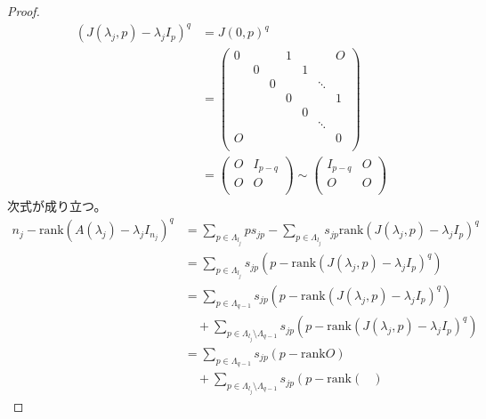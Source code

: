 \documentclass[dvipdfmx]{jsarticle}
\begin{document}
\begin{proof}
\begin{align*}
\left( J\left( \lambda_{j},p \right) - \lambda_{j}I_{p} \right)^{q} &= {J(0,p)}^{q}\\
&= \begin{pmatrix}
0 & \  & \  & 1 & \  & \  & O \\
\  & 0 & \  & \  & 1 & \  & \  \\
\  & \  & 0 & \  & \  & \ddots & \  \\
\  & \  & \  & 0 & \  & \  & 1 \\
\  & \  & \  & \  & 0 & \  & \  \\
\  & \  & \  & \  & \  & \ddots & \  \\
O & \  & \  & \  & \  & \  & 0 \\
\end{pmatrix}\\
&= \begin{pmatrix}
O & I_{p - q} \\
O & O \\
\end{pmatrix} \sim \begin{pmatrix}
I_{p - q} & O \\
O & O \\
\end{pmatrix}
\end{align*}
次式が成り立つ。
\begin{align*}
n_{j} - {\mathrm{rank}}\left( A\left( \lambda_{j} \right) - \lambda_{j}I_{n_{j}} \right)^{q} &= \sum_{p \in \varLambda_{l_{j}}} {ps_{jp}} - \sum_{p \in \varLambda_{l_{j}}} {s_{jp}{\mathrm{rank}}\left( J\left( \lambda_{j},p \right) - \lambda_{j}I_{p} \right)^{q}}\\
&= \sum_{p \in \varLambda_{l_{j}}} {s_{jp}\left( p - {\mathrm{rank}}\left( J\left( \lambda_{j},p \right) - \lambda_{j}I_{p} \right)^{q} \right)}\\
&= \sum_{p \in \varLambda_{q - 1}} {s_{jp}\left( p - {\mathrm{rank}}\left( J\left( \lambda_{j},p \right) - \lambda_{j}I_{p} \right)^{q} \right)} \\
&\quad + \sum_{p \in \varLambda_{l_{j}} \setminus \varLambda_{q - 1}} {s_{jp}\left( p - {\mathrm{rank}}\left( J\left( \lambda_{j},p \right) - \lambda_{j}I_{p} \right)^{q} \right)}\\
&= \sum_{p \in \varLambda_{q - 1}} {s_{jp}\left( p - {\mathrm{rank}}O \right)} \\
&\quad + \sum_{p \in \varLambda_{l_{j}} \setminus \varLambda_{q - 1}} {s_{jp}\left( p - {\mathrm{rank}}\begin{pmatrix}

\end{pmatrix}}
\end{align*}
\end{proof}
\end{document}
